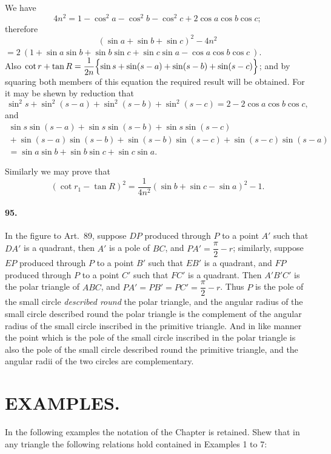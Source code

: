 \documentclass{book}[2004/02/16]
\begin{document}
\begin{mainmatter}
\begin{spacing}{1.3}
We have
\[
  4n^2=1-\cos^2 a-\cos^2 b-\cos^2 c+2\cos a\cos b\cos c;
\]
therefore
\[
(\sin a + \sin b + \sin c)^2-4n^2
\]
$= 2\ ( 1+ \sin a \sin b + \sin b \sin c + \sin c \sin a - \cos a \cos b \cos c \ )$.\\
Also $\cot r + \tan R
= \dfrac{1}{2n}\Bigl\{\sin s + \sin(s-a)+\sin(s-b)+\sin (s-c)\Bigr\}$;
and by squaring both members of this equation the required
result will be obtained. For it may be shewn by reduction that
\[
\sin^2 s + \sin^2 (s-a) + \sin^2 (s-b) + \sin^2 (s-c) = 2-2 \cos a \cos b \cos c,
\]
and
\begin{gather*}
\sin s \sin (s-a) + \sin s \sin (s-b) + \sin s \sin (s-c)
\\
{}+ \sin (s-a) \sin (s-b) + \sin (s-b) \sin (s-c) + \sin (s-c) \sin (s-a)
\\
= \sin a \sin b + \sin b \sin c + \sin c \sin a.
\end{gather*}

Similarly we may prove that
\[
(\cot r_1-\tan R)^2=\dfrac{1}{4n^2}(\sin b+\sin c-\sin a)^2 -1.
\]

\paragraph{95.} In the figure to Art.\ 89, suppose $DP$ produced through
$P$ to a point $A'$ such that $DA'$ is a quadrant, then $A'$ is a pole of
$BC$, and $PA' = \dfrac{\pi}{2}-r$; similarly, suppose $EP$ produced through $P$
to a point $B'$ such that $EB'$ is a quadrant, and $FP$ produced
through $P$ to a point $C'$ such that $FC'$ is a quadrant. Then
$A'B'C'$ is the polar triangle of $ABC$, and $PA' = PB' = PC' = \dfrac{\pi}{2}-r$.
Thus $P$ is the pole of the small circle \textit{described round} the polar
triangle, and the angular radius of the small circle described round
the polar triangle is the complement of the angular radius of the
small circle inscribed in the primitive triangle. And in like
manner the point which is the pole of the small circle inscribed in
the polar triangle is also the pole of the small circle described
round the primitive triangle, and the angular radii of the two
circles are complementary.

\section*{\centering\normalsize EXAMPLES.}

In the following examples the notation of the Chapter is
retained. Shew that in any triangle the following relations hold contained
in Examples 1 to 7:
\medskip


\end{spacing}
\end{mainmatter}
\end{document}
